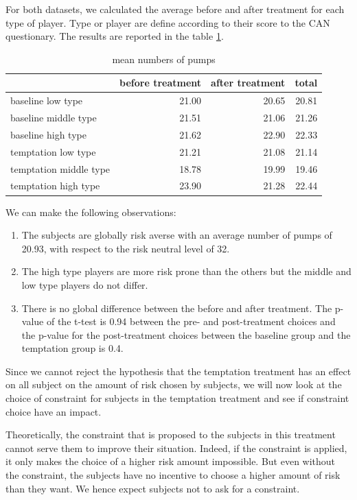 \documentclass[
]{book}
\providecommand{\tightlist}{%
  \setlength{\itemsep}{0pt}\setlength{\parskip}{0pt}}
\begin{document}
For both datasets, we calculated the average before and after treatment for
each type of player.
Type or player are define according to their score to the CAN questionary.
The results are reported in the table \ref{tab:desc-stat2}.

\begin{table}

\caption{\label{tab:desc-stat2}mean numbers of pumps}
\centering
\begin{tabular}[t]{l|r|r|r}
\hline
  & before treatment & after treatment & total\\
\hline
baseline low type & 21.00 & 20.65 & 20.81\\
\hline
baseline middle type & 21.51 & 21.06 & 21.26\\
\hline
baseline high type & 21.62 & 22.90 & 22.33\\
\hline
temptation low type & 21.21 & 21.08 & 21.14\\
\hline
temptation middle type & 18.78 & 19.99 & 19.46\\
\hline
temptation high type & 23.90 & 21.28 & 22.44\\
\hline
\end{tabular}
\end{table}

We can make the following observations:

\begin{enumerate}
\def\labelenumi{\arabic{enumi}.}
\tightlist
\item
  The subjects are globally risk averse with an average number of pumps of
  20.93, with respect to the risk neutral level of 32.
\item
  The high type players are more risk prone than the others but the middle
  and low type players do not differ.
\item
  There is no global difference between the before and after treatment.
  The p-value of the t-test is 0.94 between the pre- and post-treatment
  choices and the p-value for the post-treatment choices between the baseline
  group and the temptation group is 0.4.
\end{enumerate}

Since we cannot reject the hypothesis that the temptation treatment has an effect
on all subject on the amount of risk chosen by subjects, we will now look at
the choice of constraint for subjects in the temptation treatment and see if
constraint choice have an impact.

Theoretically, the constraint that is proposed
to the subjects in this treatment cannot serve them to improve
their situation.
Indeed, if the constraint is applied, it only makes the choice of a higher risk
amount impossible.
But even without the constraint, the subjects have no incentive to choose a
higher amount of risk than they want.
We hence expect subjects not to ask for a constraint.
\end{document}
